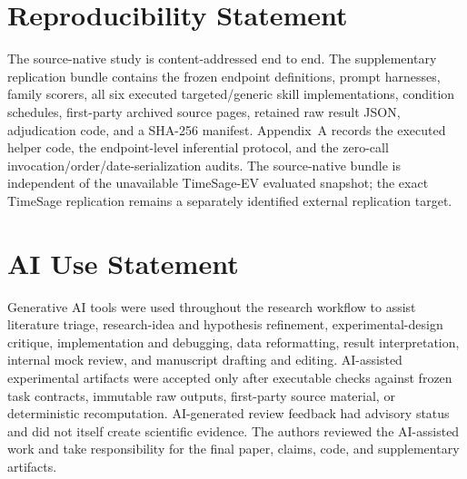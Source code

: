 \section*{Reproducibility Statement}
The source-native study is content-addressed end to end. The supplementary replication bundle contains the frozen endpoint definitions, prompt harnesses, family scorers, all six executed targeted/generic skill implementations, condition schedules, first-party archived source pages, retained raw result JSON, adjudication code, and a SHA-256 manifest. Appendix~A records the executed helper code, the endpoint-level inferential protocol, and the zero-call invocation/order/date-serialization audits. The source-native bundle is independent of the unavailable TimeSage-EV evaluated snapshot; the exact TimeSage replication remains a separately identified external replication target.

\section*{AI Use Statement}
Generative AI tools were used throughout the research workflow to assist literature triage, research-idea and hypothesis refinement, experimental-design critique, implementation and debugging, data reformatting, result interpretation, internal mock review, and manuscript drafting and editing. AI-assisted experimental artifacts were accepted only after executable checks against frozen task contracts, immutable raw outputs, first-party source material, or deterministic recomputation. AI-generated review feedback had advisory status and did not itself create scientific evidence. The authors reviewed the AI-assisted work and take responsibility for the final paper, claims, code, and supplementary artifacts.
